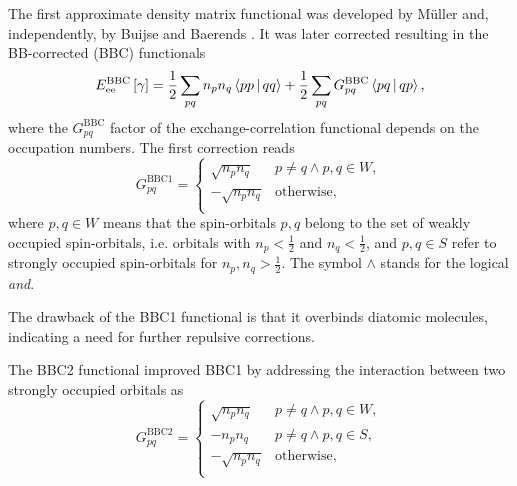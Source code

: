 The first approximate density matrix functional was developed by Müller
and, independently, by Buijse and Baerends .
It was later corrected resulting in the BB-corrected (BBC) functionals
\begin{equation} \label{eq:Eee-BBC-functional}
    E_{\text{ee}}^{\text{BBC}}\left[ \fordm \right] =
    \frac{1}{2} \sum_{pq} n_p n_q \Braket{pp | qq} +
    \frac{1}{2} \sum_{pq} G_{pq}^{\text{BBC}} \Braket{pq | qp}
    ,
\end{equation}
where the $G_{pq}^{\text{BBC}}$ factor of the exchange-correlation functional
depends on the occupation numbers.
The first correction reads
\begin{equation} \label{eq:GBBC1}
    G_{pq}^{\text{BBC1}} = 
    \begin{cases}
        \sqrt{n_p n_q} & p \not= q \wedge p,q \in W, \\
        -\sqrt{n_p n_q} & \text{otherwise}, \\
    \end{cases}
\end{equation}
where $p,q \in W$ means that the spin-orbitals $p,q$ belong to the set of weakly
occupied spin-orbitals, i.e. 
orbitals with $n_p < \frac{1}{2}$ and $n_q < \frac{1}{2}$, and
$p,q \in S$ refer to strongly occupied spin-orbitals for
$n_p, n_q > \frac{1}{2}$.
The symbol $\wedge$ stands for the logical \textit{and}.

The drawback of the BBC1 functional is that it overbinds diatomic molecules,
indicating a need for further repulsive corrections.

The BBC2 functional improved BBC1 by addressing the interaction between two
strongly occupied orbitals as
\begin{equation} \label{eq:GBBC2}
    G_{pq}^{\text{BBC2}} = 
    \begin{cases}
        \sqrt{n_p n_q} & p \not= q \wedge p,q \in W, \\
        -n_p n_q & p \not= q \wedge p,q \in S, \\
        -\sqrt{n_p n_q} & \text{otherwise}, \\
    \end{cases}
\end{equation}

